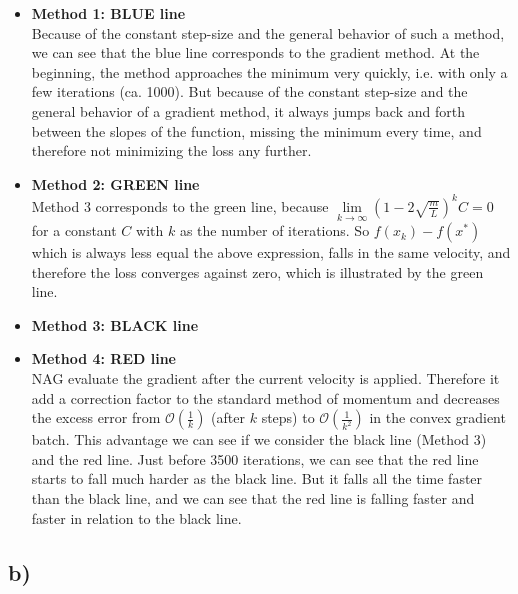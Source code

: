 \documentclass[a4paper]{article}
\begin{document}
        \begin{itemize}
            \item \textbf{Method 1: BLUE line}\\
                Because of the constant step-size and the general behavior of such a method, we can see that the blue line corresponds to the gradient method.
                At the beginning, the method approaches the minimum very quickly, i.e. with only a few iterations (ca. 1000). 
                But because of the constant step-size and the general behavior of a gradient method, it always jumps back and forth between the slopes of the function, missing the minimum every time, and therefore not minimizing the loss any further.
            
            \item \textbf{Method 2: GREEN line}\\
                Method 3 corresponds to the green line, because $\lim\limits_{k \rightarrow \infty} (1-2\sqrt{\frac{m}{L}})^kC = 0$ for a constant $C$ with $k$ as the number of iterations.
                So $f(x_k) - f(x^*)$ which is always less equal the above expression, falls in the same velocity, and therefore the loss converges against zero, which is illustrated by the green line.
            
            \item \textbf{Method 3: BLACK line}\\
                
            
            \item \textbf{Method 4: RED line}\\
                NAG evaluate the gradient after the current velocity is applied.
                Therefore it add a correction factor to the standard method of momentum and decreases the excess error from $\mathcal{O}(\frac{1}{k})$ (after $k$ steps) to $\mathcal{O}(\frac{1}{k^2})$ in the convex gradient batch.
                This advantage we can see if we consider the black line (Method 3) and the red line.
                Just before 3500 iterations, we can see that the red line starts to fall much harder as the black line.
                But it falls all the time faster than the black line, and we can see that the red line is falling faster and faster in relation to the black line.
                
            
        \end{itemize}

    
    \subsection*{b)}
        
\end{document}
